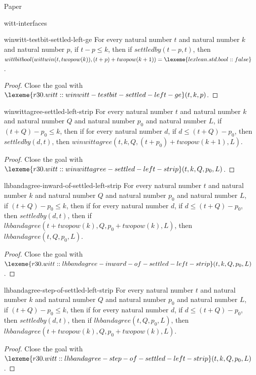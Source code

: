 \begin{lexlean}{Paper}
\begin{section}{witt-interfaces}
  \begin{theorem}{winwitt-testbit-settled-left-ge}
  For every natural number \(t\) and natural number \(k\) and natural number \(p\), if \(t - p ≤ k\), then if \(settledby(t - p, t)\), then \(wittbitbool(wittwin(t, twopow(k)), (t + p) + twopow(k + 1)) = \lexeme{lexlean.std.bool::false}\).
  \begin{proof}
  Close the goal with \(\lexeme{r30.witt::winwitt-testbit-settled-left-ge}(t, k, p)\).
  \end{proof}
  \end{theorem}

  \begin{theorem}{winwittagree-settled-left-strip}
  For every natural number \(t\) and natural number \(k\) and natural number \(Q\) and natural number \(p_0\) and natural number \(L\), if \((t + Q) - p_0 ≤ k\), then if for every natural number \(d\), if \(d ≤ (t + Q) - p_0\), then \(settledby(d, t)\), then \(winwittagree(t, k, Q, (t + p_0) + twopow(k + 1), L)\).
  \begin{proof}
  Close the goal with \(\lexeme{r30.witt::winwittagree-settled-left-strip}(t, k, Q, p_0, L)\).
  \end{proof}
  \end{theorem}

  \begin{theorem}{lhbandagree-inward-of-settled-left-strip}
  For every natural number \(t\) and natural number \(k\) and natural number \(Q\) and natural number \(p_0\) and natural number \(L\), if \((t + Q) - p_0 ≤ k\), then if for every natural number \(d\), if \(d ≤ (t + Q) - p_0\), then \(settledby(d, t)\), then if \(lhbandagree(t + twopow(k), Q, p_0 + twopow(k), L)\), then \(lhbandagree(t, Q, p_0, L)\).
  \begin{proof}
  Close the goal with \(\lexeme{r30.witt::lhbandagree-inward-of-settled-left-strip}(t, k, Q, p_0, L)\).
  \end{proof}
  \end{theorem}

  \begin{theorem}{lhbandagree-step-of-settled-left-strip}
  For every natural number \(t\) and natural number \(k\) and natural number \(Q\) and natural number \(p_0\) and natural number \(L\), if \((t + Q) - p_0 ≤ k\), then if for every natural number \(d\), if \(d ≤ (t + Q) - p_0\), then \(settledby(d, t)\), then if \(lhbandagree(t, Q, p_0, L)\), then \(lhbandagree(t + twopow(k), Q, p_0 + twopow(k), L)\).
  \begin{proof}
  Close the goal with \(\lexeme{r30.witt::lhbandagree-step-of-settled-left-strip}(t, k, Q, p_0, L)\).
  \end{proof}
  \end{theorem}


\end{section}
\end{lexlean}
